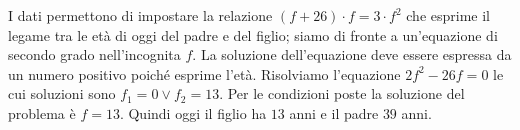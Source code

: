 \begin{soluzione}
I dati permettono di impostare la relazione \((f +26) \cdot f = 3 \cdot 
f^{2}\) 
che esprime il legame tra le età di oggi del padre e del figlio; siamo di
fronte a un'equazione di secondo grado nell'incognita \(f\). La soluzione 
dell'equazione deve essere espressa da un numero positivo poiché esprime 
l'età.
Risolviamo l'equazione \(2 f^{2} -26 f = 0\) le cui soluzioni sono 
\(f_{1} = 0 \vee f_{2} = 13\). 
Per le condizioni poste la soluzione del problema è
\(f = 13\). Quindi oggi il figlio ha \(13\) anni e il padre \(39\) anni.
\end{soluzione}
% 
% 
% 
% 
% 
% 
% 
% 
% 
